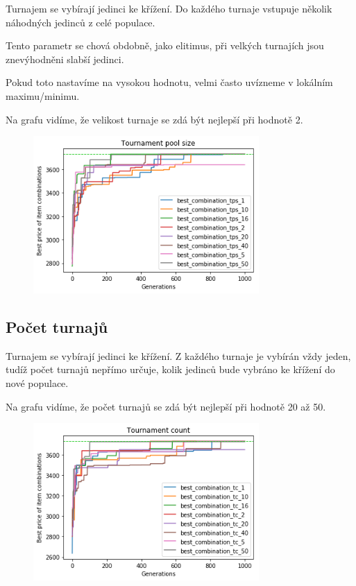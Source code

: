 \documentclass[a4paper,10pt,twocolumn]{article}
\begin{document}
\begin{itemize}
\begin{itemize}
Turnajem se vybírají jedinci ke křížení. Do každého turnaje vstupuje několik náhodných jedinců z celé populace.

Tento parametr se chová obdobně, jako elitimus, při velkých turnajích jsou znevýhodněni slabší jedinci.

Pokud toto nastavíme na vysokou hodnotu, velmi často uvízneme v lokálním maximu/minimu.

Na grafu vidíme, že velikost turnaje se zdá být nejlepší při hodnotě 2.


\begin{figure}[H]
  \begin{center}
    \includegraphics[height=6cm]{graphs/tournament_pool_size.png}
  \end{center}
\end{figure}



\subsection{Počet turnajů}

Turnajem se vybírají jedinci ke křížení. Z každého turnaje je vybírán vždy jeden, tudíž počet turnajů nepřímo určuje, kolik jedinců bude vybráno ke křížení do nové populace.


Na grafu vidíme, že počet turnajů se zdá být nejlepší při hodnotě 20 až 50.



\begin{figure}[H]
  \begin{center}
    \includegraphics[height=6cm]{graphs/tournament_count.png}
  \end{center}
\end{figure}



\end{itemize}
\end{itemize}
\end{document}
